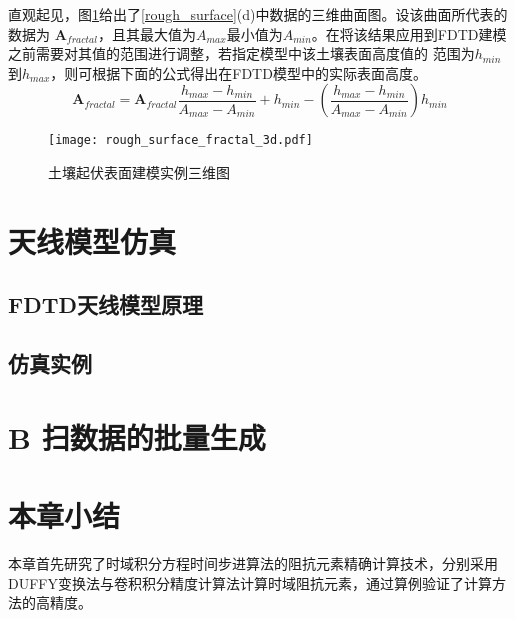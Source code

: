 直观起见，图\ref{rough_surface_3d}给出了\ref{rough_surface}(d)中数据的三维曲面图。设该曲面所代表的数据为
$\mathbf{A}_{fractal}$，且其最大值为$A_{max}$最小值为$A_{min}$。在将该结果应用到FDTD建模之前需要对其值的范围进行调整，若指定模型中该土壤表面高度值的
范围为$h_{min}$到$h_{max}$，则可根据下面的公式得出在FDTD模型中的实际表面高度。
\begin{equation}
	\mathbf{A}_{fractal} = \mathbf{A}_{fractal} \frac{h_{max} - h_{min}}{A_{max} - A_{min}} + 
		h_{min} - (\frac{h_{max} - h_{min}}{A_{max} - A_{min}}) h_{min}
\end{equation}
\begin{figure}[htbp]
	\texttt{[image: rough\_surface\_fractal\_3d.pdf]}
	\caption[]{土壤起伏表面建模实例三维图}
	\label{rough_surface_3d}
\end{figure}
\section{天线模型仿真}
\subsection{FDTD天线模型原理}
\subsection{仿真实例}
\section{B 扫数据的批量生成}
\section{本章小结}
本章首先研究了时域积分方程时间步进算法的阻抗元素精确计算技术，分别采用DUFFY变换法与卷积积分精度计算法计算时域阻抗元素，通过算例验证了计算方法的高精度。

